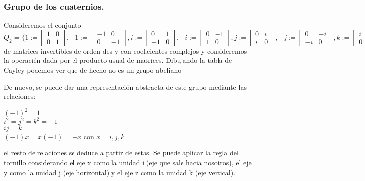 \subsubsection{Grupo de los cuaternios.}

Consideremos el conjunto 
$Q_2 = \{
1 := \begin{bmatrix}
    1 & 0  \\
    0 & 1 
\end{bmatrix},
-1 := \begin{bmatrix}
    -1 & 0  \\
    0 & -1 
\end{bmatrix},
i := \begin{bmatrix}
    0 & 1  \\
    -1 & 0 
\end{bmatrix},
-i := \begin{bmatrix}
    0 & -1  \\
    1 & 0 
\end{bmatrix},
j := \begin{bmatrix}
    0 & i  \\
    i & 0 
\end{bmatrix},
-j := \begin{bmatrix}
    0 & -i  \\
    -i & 0 
\end{bmatrix},
k := \begin{bmatrix}
    i & 0  \\
    0 & -i 
\end{bmatrix},
-k := \begin{bmatrix}
    -i & 0  \\
    0 & i 
\end{bmatrix} \}$
de matrices invertibles de orden dos y con coeficientes complejos y consideremos la operación dada por el producto usual de matrices. Dibujando la tabla de Cayley podemos ver que de hecho no es un grupo abeliano.

De nuevo, se puede dar una representación abstracta de este grupo mediante las relaciones:

$(-1)^2 = 1$ \\
$i^2 = j^2 = k^2 = -1$ \\
$ij = k$ \\
$(-1)x = x(-1) = -x$ con $x = i,j,k$

el resto de relaciones se deduce a partir de estas. Se puede aplicar la regla del tornillo considerando el eje x como la unidad i (eje que sale hacia nosotros), el eje y como la unidad j (eje horizontal) y el eje z como la unidad k (eje vertical).

